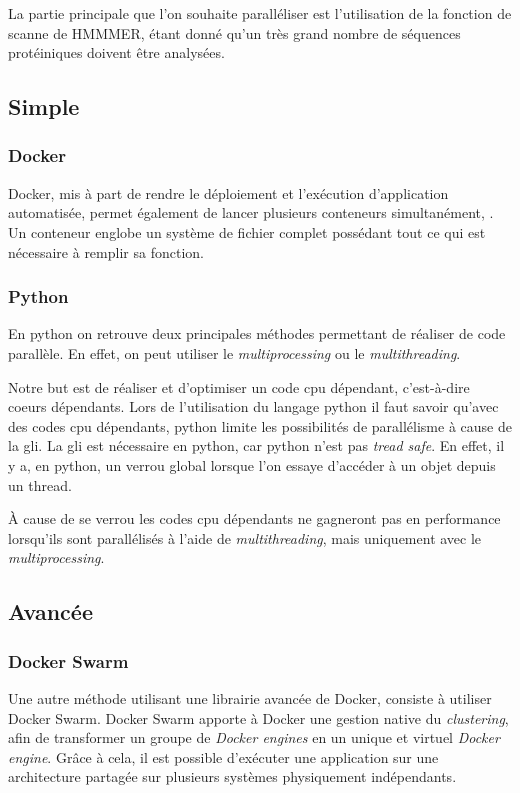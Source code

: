 La partie principale que l'on souhaite paralléliser est l'utilisation de la fonction de scanne de HMMMER, étant donné qu'un très grand nombre de séquences protéiniques doivent être analysées.

\subsection{Simple}
\subsubsection{Docker}
Docker, mis à part de rendre le déploiement et l'exécution d'application automatisée, permet également de lancer plusieurs conteneurs simultanément, . Un conteneur englobe un système de fichier complet possédant tout ce qui est nécessaire à remplir sa fonction. 

\subsubsection{Python}
En python on retrouve deux principales méthodes permettant de réaliser de code parallèle. En effet, on peut utiliser le \emph{multiprocessing} ou le \emph{multithreading}.

Notre but est de réaliser et d'optimiser un code \gls{cpu} dépendant, c'est-à-dire coeurs dépendants. Lors de l'utilisation du langage python il faut savoir qu'avec des codes \gls{cpu} dépendants, python limite les possibilités de parallélisme à cause de la \gls{gli}. La \gls{gli} est nécessaire en python, car python n'est pas \emph{tread safe}. En effet, il y a, en python, un verrou global lorsque l'on essaye d'accéder à un objet depuis un thread.

À cause de se verrou les codes \gls{cpu} dépendants ne gagneront pas en performance lorsqu'ils sont parallélisés à l'aide de \emph{multithreading}, mais uniquement avec le \emph{multiprocessing}.

\subsection{Avancée}
\subsubsection{Docker Swarm}
Une autre méthode utilisant une librairie avancée de Docker, consiste à utiliser Docker Swarm. Docker Swarm apporte à Docker une gestion native du \emph{clustering}, afin de transformer un groupe de \emph{Docker engines} en un unique et virtuel \emph{Docker engine}. Grâce à cela, il est possible d'exécuter une application sur une architecture partagée sur plusieurs systèmes physiquement indépendants. 

